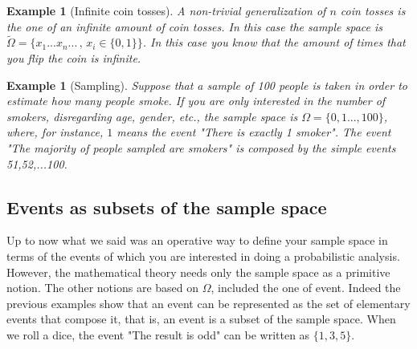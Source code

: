 \documentclass[12pt]{article}
\newtheorem{example}[theorem]{Example}
\newcommand{\<}{{\langle \!\! \langle}}
\renewcommand{\>}{{\rangle \!\! \rangle}}
\begin{document}
\begin{example}[Infinite coin tosses]
A non-trivial generalization of $n$ coin tosses is the one of an infinite amount of coin tosses. In this case the sample space is 
$\tilde{\Omega}=\{x_1...x_n...\, ,\, x_i\in\{0,1\}\}$. In this case you know that the amount of times that you flip the coin is infinite. 

 
\end{example}

%


\begin{example}[Sampling]
 Suppose that a sample of 100 people is taken in order to estimate how many people smoke. If you are only interested in the number of smokers, disregarding age, gender, etc., the sample space is  $\Omega=\{0,1...,100\}$, where, for instance, $1$ means the event "There is exactly 1 smoker". The event "The majority of people sampled are smokers" is composed by the simple events 51,52,...100.  
\end{example}



\subsection{Events as subsets of the sample space}

Up to now what we said was an operative way to define your sample space in terms of the events of which you are interested in doing a probabilistic analysis. However, the mathematical theory needs only the sample space as a primitive notion. The other notions are based on $\Omega$, included the one of event. Indeed the previous examples show that an event can be represented as the set of elementary events that compose it, that is, an event is a subset of the sample space.
 When we roll a dice, the event "The result is odd"  can be written as $\{1,3,5\}$. 
     
\end{document}
